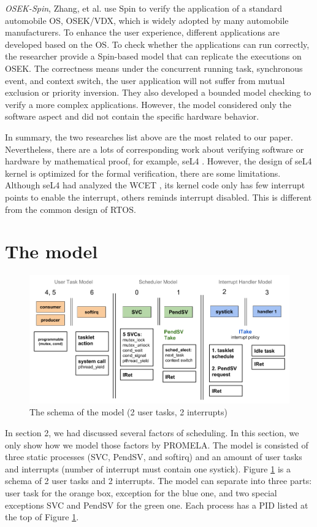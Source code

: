 \textit{OSEK-Spin}, Zhang, et al. \cite{10.1007/978-3-319-17581-2_16} use Spin to verify the application of a standard automobile OS, OSEK/VDX, which is widely adopted by many automobile manufacturers. To enhance the user experience, different applications are developed based on the OS. To check whether the applications can run correctly, the researcher provide a Spin-based model that can replicate the executions on OSEK. The correctness means under the concurrent running task, synchronous event, and context switch, the user application will not suffer from mutual exclusion or priority inversion. They also developed a bounded model checking to verify a more complex applications. However, the model considered only the software aspect and did not contain the specific hardware behavior.

In summary, the two researches list above are the most related to our paper. Nevertheless, there are a lots of corresponding work about verifying software or hardware by mathematical proof, for example, seL4 \cite{Klein:2009:SFV:1629575.1629596}. However, the design of seL4 kernel is optimized for the formal verification, there are some limitations. Although seL4 had analyzed the WCET \cite{6121451}, its kernel code only has few interrupt points to enable the interrupt, others reminds interrupt disabled. This is different from the common design of RTOS.

\section{The model}

\begin{figure}
\includegraphics[width=0.7\linewidth]{img/model}
\caption{The schema of the model (2 user tasks, 2 interrupts)}
\label{fig:model}
\end{figure}

In section 2, we had discussed several factors of scheduling. In this section, we only show how we model those factors by PROMELA. The model is consisted of three static processes (SVC, PendSV, and softirq) and an amount of user tasks and interrupts (number of interrupt must contain one systick). Figure \ref{fig:model} is a schema of 2 user tasks and 2 interrupts. The model can separate into three parts: user task for the orange box, exception for the blue one, and two special exceptions SVC and PendSV for the green one. Each process has a PID listed at the top of Figure \ref{fig:model}.

